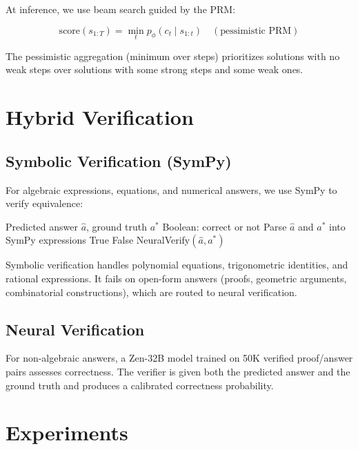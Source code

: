 \documentclass[11pt,a4paper]{article}
\begin{document}
At inference, we use beam search guided by the PRM:

\begin{equation}
\text{score}(s_{1:T}) = \min_t p_\phi(c_t \mid s_{1:t}) \quad (\text{pessimistic PRM})
\end{equation}

The pessimistic aggregation (minimum over steps) prioritizes solutions with no
weak steps over solutions with some strong steps and some weak ones.

\section{Hybrid Verification}

\subsection{Symbolic Verification (SymPy)}

For algebraic expressions, equations, and numerical answers, we use SymPy to
verify equivalence:

\begin{algorithm}[H]
\caption{Symbolic Verification}
\begin{algorithmic}[1]
\REQUIRE Predicted answer $\hat{a}$, ground truth $a^*$
\ENSURE Boolean: correct or not
\STATE Parse $\hat{a}$ and $a^*$ into SymPy expressions
  \RETURN True
  \RETURN False
\ELSE
  \STATE \RETURN NeuralVerify$(\hat{a}, a^*)$
\ENDIF
\end{algorithmic}
\end{algorithm}

Symbolic verification handles polynomial equations, trigonometric identities, and
rational expressions. It fails on open-form answers (proofs, geometric arguments,
combinatorial constructions), which are routed to neural verification.

\subsection{Neural Verification}

For non-algebraic answers, a Zen-32B model trained on 50K verified proof/answer
pairs assesses correctness. The verifier is given both the predicted answer and
the ground truth and produces a calibrated correctness probability.

\section{Experiments}
\end{document}
